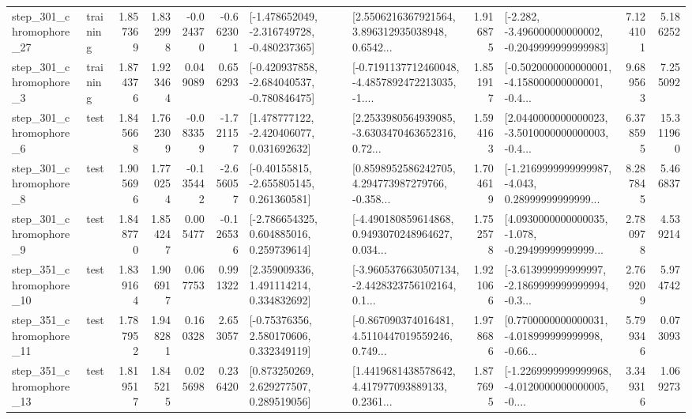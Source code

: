 \begin{tabular}{llrrrrllrlrr}
  step\_301\_chromophore\_27 &  training &      1.857369 &    1.832998 &     -0.024370 & -0.662301 &  [-1.478652049, -2.316749728, -0.480237365] &  [2.5506216367921564, 3.896312935038948, 0.6542... &       1.916875 &  [-2.282, -3.496000000000002, -0.2049999999999983] &            7.124101 &          5.186252 \\
   step\_301\_chromophore\_3 &  training &      1.874376 &    1.923464 &      0.049089 &  0.656293 &  [-0.420937858, -2.684040537, -0.780846475] &  [-0.7191137712460048, -4.4857892472213035, -1.... &       1.851917 &  [-0.5020000000000001, -4.158000000000001, -0.4... &            9.689563 &          7.255092 \\
   step\_301\_chromophore\_6 &      test &      1.845668 &    1.762309 &     -0.083359 & -1.721157 &    [1.478777122, -2.420406077, 0.031692632] &  [2.2533980564939085, -3.6303470463652316, 0.72... &       1.594163 &  [2.0440000000000023, -3.5010000000000003, -0.4... &            6.378595 &         15.311960 \\
   step\_301\_chromophore\_8 &      test &      1.905696 &    1.770254 &     -0.135442 & -2.656057 &    [-0.40155815, -2.655805145, 0.261360581] &  [0.8598952586242705, 4.294773987279766, -0.358... &       1.704619 &  [-1.2169999999999987, -4.043, 0.28999999999999... &            8.287845 &          5.466837 \\
   step\_301\_chromophore\_9 &      test &      1.848770 &    1.854247 &      0.005477 & -0.126536 &    [-2.786654325, 0.604885016, 0.259739614] &  [-4.490180859614868, 0.9493070248964627, 0.034... &       1.752578 &  [4.0930000000000035, -1.078, -0.29499999999999... &            2.780978 &          4.539214 \\
  step\_351\_chromophore\_10 &      test &      1.839164 &    1.906917 &      0.067753 &  0.991322 &     [2.359009336, 1.491114214, 0.334832692] &  [-3.9605376630507134, -2.4428323756102164, 0.1... &       1.921066 &  [-3.613999999999997, -2.1869999999999994, -0.3... &            2.769209 &          5.974742 \\
  step\_351\_chromophore\_11 &      test &      1.787952 &    1.948281 &      0.160328 &  2.653057 &     [-0.75376356, 2.580170606, 0.332349119] &  [-0.867090374016481, 4.5110447019559246, 0.749... &       1.978686 &  [0.7700000000000031, -4.018999999999998, -0.66... &            5.799346 &          0.073093 \\
  step\_351\_chromophore\_13 &      test &      1.819517 &    1.845215 &      0.025698 &  0.236420 &     [0.873250269, 2.629277507, 0.289519056] &  [1.4419681438578642, 4.417977093889133, 0.2361... &       1.877695 &  [-1.2269999999999968, -4.0120000000000005, -0.... &            3.349316 &          1.069273 \\

\end{tabular}

